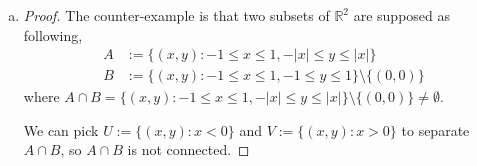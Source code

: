 \begin{Exercise}
\begin{enumerate}[a)]
\begin{proof}
\begin{enumerate}
\item [$\mathbf{Case\ 2.}$]
$a_1 \leq b_1$ and $a_2 \geq b_2$.

where $A\cap B = [b1, b2] \neq \emptyset$. Then $A\cup B = [a_1, a_2]$ is an interval, so is connected.

\item [$\mathbf{Case\ 3.}$]
$b_1 \leq a_1$ and $a_1 \leq b_2 < a_2$.

where $A\cap B = [a1, b2] \neq \emptyset$. Then $A\cup B = [b_1, a_2]$ is an interval, so is connected.

\item [$\mathbf{Case\ 4.}$]
$b_1 \leq a_1$ and $b_2 \geq a_2$.

where $A\cap B = [a1, a2] \neq \emptyset$. Then $A\cup B = [b_1, b_2]$ is an interval, so is connected.
\end{enumerate}
Hence, $A\cap B$ is always connected as promised.
\end{proof}

\item
\begin{proof}
The counter-example is that two subsets of $\mathbb{R}^2$ are supposed as following, 
\begin{align*}
A &:= \{(x,y) : -1\leq x \leq 1, -|x| \leq y \leq |x|\} \\
B &:=\{(x,y) : -1 \leq x \leq 1, -1 \leq y \leq 1\}\setminus\{(0,0)\}
\end{align*}
where $A\cap B = \{(x, y): -1 \leq x \leq 1, -|x| \leq y \leq |x|\} \setminus \{(0,0)\} \neq \emptyset.$

We can pick $U := \{(x,y):x<0\}$ and $V := \{(x,y):x>0\}$ to separate $A\cap B$, so $A\cap B$ is not connected.
\end{proof}

\end{enumerate}
\end{Exercise}